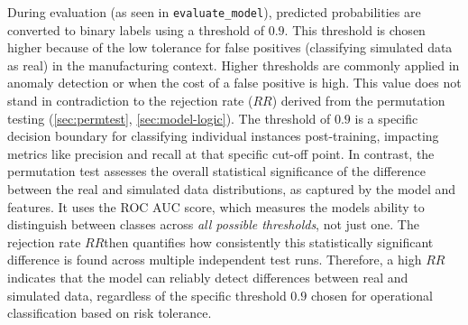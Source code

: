During evaluation (as seen in \texttt{evaluate\_model}), predicted probabilities are converted to binary labels using a threshold of $0.9$. This threshold is chosen higher because of the low tolerance for false positives (classifying simulated data as real) in the manufacturing context. Higher thresholds are commonly applied in anomaly detection or when the cost of a false positive is high. This value does not stand in contradiction to the rejection rate ($RR$) derived from the permutation testing (\autoref{sec:permtest}, \autoref{sec:model-logic}). The threshold of $0.9$ is a specific decision boundary for classifying individual instances post-training, impacting metrics like precision and recall at that specific cut-off point. In contrast, the permutation test assesses the overall statistical significance of the difference between the real and simulated data distributions, as captured by the model and features. It uses the ROC AUC score, which measures the models ability to distinguish between classes across \textit{all possible thresholds}, not just one. The rejection rate $RR$then quantifies how consistently this statistically significant difference is found across multiple independent test runs. Therefore, a high $RR$ indicates that the model can reliably detect differences between real and simulated data, regardless of the specific threshold $0.9$ chosen for operational classification based on risk tolerance.

